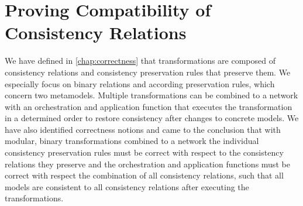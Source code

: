 \chapter{Proving Compatibility of Consistency Relations
}
\label{chap:compatibility}


We have defined in \autoref{chap:correctness} that transformations are composed of \glspl{consistency relation} and \glspl{consistency preservation rule} that preserve them.
We especially focus on binary relations and according preservation rules, which concern two metamodels.
Multiple transformations can be combined to a network with an orchestration and application function that executes the transformation in a determined order to restore consistency after changes to concrete models.
We have also identified correctness notions and came to the conclusion that with modular, binary transformations combined to a network the individual consistency preservation rules must be correct with respect to the consistency relations they preserve and the orchestration and application functions must be correct with respect the combination of all consistency relations, such that all models are consistent to all consistency relations after executing the transformations.


